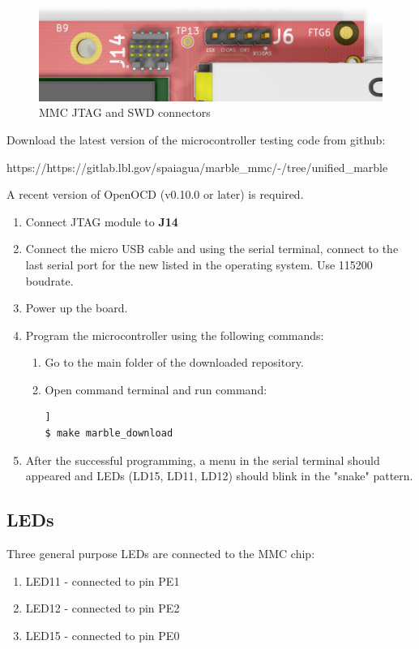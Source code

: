 \documentclass[12pt,oneside,a4]{article}
\begin{document}
\begin{figure}[H]
\begin{center}
\includegraphics[width=1\linewidth]{mmcjtagswd.png}
 \caption{MMC JTAG and SWD connectors}\label{mmcjtagswd}
\end{center}
\end{figure}

Download the latest version of the microcontroller testing code from github:
\begin{leftbar}
https://https://gitlab.lbl.gov/spaiagua/marble\_mmc/-/tree/unified\_marble
\end{leftbar}

A recent version of OpenOCD (v0.10.0 or later) is required.
\begin{enumerate}
	\item Connect JTAG module to \textbf{J14}
	\item Connect the micro USB cable and using the serial terminal, connect to the last serial port for the new listed in the operating system. Use 115200 boudrate.
	\item Power up the board.
	\item Program the microcontroller using the following commands:
	\begin{enumerate}
	\item Go to the main folder of the downloaded repository.
	\item Open command terminal and run command:
	\begin{lstlisting}[backgroundcolor = \color{Gainsboro}, language=bash, frame=none]]
$ make marble_download
	\end{lstlisting}
	\end{enumerate}
	\item After the successful programming, a menu in the serial terminal should appeared and LEDs (LD15, LD11, LD12) should blink in the "snake" pattern.
\end{enumerate}
\subsection{LEDs}
Three general purpose LEDs are connected to the MMC chip:
\begin{enumerate}
	\item LED11 - connected to pin PE1
	\item LED12 - connected to pin PE2
	\item LED15 - connected to pin PE0
\end{enumerate}
\end{document}
